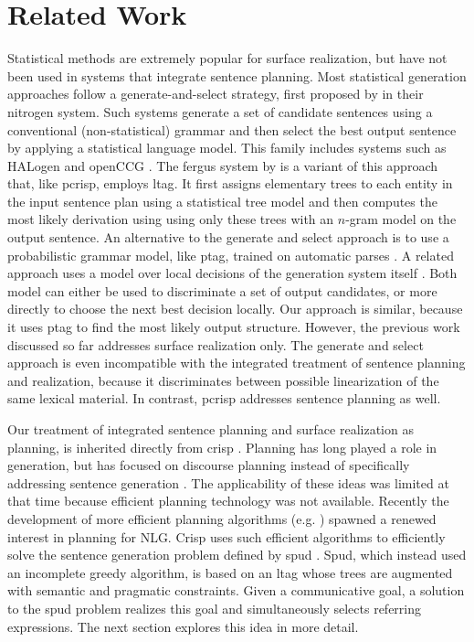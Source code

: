 \section{Related Work}
\label{sec:related}
Statistical methods are extremely popular for surface realization, but have not been used in systems that integrate sentence planning. Most statistical generation approaches follow a generate-and-select strategy, first proposed by  in their {\sc nitrogen} system. Such systems generate a set of candidate sentences using a conventional (non-statistical) grammar and then select the best output sentence by applying a statistical language model. This family includes systems such as {\sc HAL}ogen \cite{langkildeknight1998,langkilde2000} and open{\sc CCG} \cite{whitebaldridge2003}.  The {\sc fergus} system by  is a variant of this approach that, like {\sc pcrisp}, employs {\sc ltag}. It first assigns elementary trees to each entity in the input sentence plan using a statistical tree model and then computes the most likely derivation using using only these trees with an $n$-gram model on the output sentence. An alternative to the generate and select approach is to use a probabilistic grammar model, like {\sc ptag}, trained on automatic parses \cite{zhongstent2005}. A related approach uses a model over local decisions of the generation system itself \cite{belz2008}. Both model can either be used to discriminate a set of output candidates, or more directly to choose the next best decision locally. Our approach is similar, because it uses {\sc ptag} to find the most likely output structure. However, the previous work discussed so far addresses surface realization only.
The generate and select approach is even incompatible with the integrated treatment of sentence planning and realization, because it discriminates between possible linearization of the same lexical material. In contrast, {\sc pcrisp} addresses sentence planning as well.

Our treatment of integrated sentence planning and surface realization as planning, is inherited directly from {\sc crisp} \cite{kollerstone2007}.  Planning has long played a role in generation, but has focused on discourse planning instead of specifically addressing sentence generation \cite{hovy1988,appelt1992}. The applicability of these ideas was limited at that time because efficient planning technology was not available. Recently the development of more efficient planning algorithms (e.g. ) spawned a renewed interest in planning for NLG.  
{\sc Crisp} uses such efficient algorithms to efficiently solve the sentence generation problem defined by {\sc spud} \cite{stonedoran1997}. {\sc Spud}, which instead used an incomplete greedy algorithm, is based on an {\sc ltag} whose trees are augmented with semantic and pragmatic constraints. Given a communicative goal, a solution to the {\sc spud} problem realizes this goal and simultaneously selects referring expressions. The next section explores this idea in more detail.

